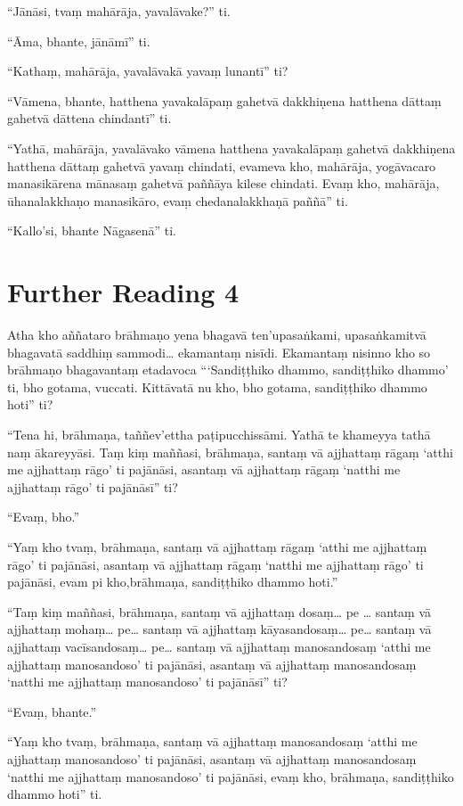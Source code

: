 “Jānāsi, tvaṃ mahārāja, yavalāvake?” ti.

“Āma, bhante, jānāmī” ti.

“Kathaṃ, mahārāja, yavalāvakā yavaṃ lunantī” ti?

“Vāmena, bhante, hatthena yavakalāpaṃ gahetvā dakkhiṇena hatthena dāttaṃ gahetvā dāttena chindantī” ti.

“Yathā, mahārāja, yavalāvako vāmena hatthena yavakalāpaṃ gahetvā dakkhiṇena hatthena dāttaṃ gahetvā yavaṃ chindati, evameva kho, mahārāja, yogāvacaro manasikārena mānasaṃ gahetvā paññāya kilese chindati. Evaṃ kho, mahārāja, ūhanalakkhaṇo manasikāro, evaṃ chedanalakkhaṇā paññā” ti.

“Kallo’si, bhante Nāgasenā” ti.

\section*{Further Reading 4}

Atha kho aññataro brāhmaṇo yena bhagavā ten’upasaṅkami, upasaṅkamitvā bhagavatā saddhiṃ sammodi… ekamantaṃ nisīdi. Ekamantaṃ nisinno kho so brāhmaṇo bhagavantaṃ etadavoca “‘Sandiṭṭhiko dhammo, sandiṭṭhiko dhammo’ ti, bho gotama, vuccati. Kittāvatā nu kho, bho gotama, sandiṭṭhiko dhammo hoti” ti?

“Tena hi, brāhmaṇa, taññev’ettha paṭipucchissāmi. Yathā te khameyya tathā naṃ ākareyyāsi. Taṃ kiṃ maññasi, brāhmaṇa, santaṃ vā ajjhattaṃ rāgaṃ ‘atthi me ajjhattaṃ rāgo’ ti pajānāsi, asantaṃ vā ajjhattaṃ rāgaṃ ‘natthi me ajjhattaṃ rāgo’ ti pajānāsī” ti?

“Evaṃ, bho.”

“Yaṃ kho tvaṃ, brāhmaṇa, santaṃ vā ajjhattaṃ rāgaṃ ‘atthi me ajjhattaṃ rāgo’ ti pajānāsi, asantaṃ vā ajjhattaṃ rāgaṃ ‘natthi me ajjhattaṃ rāgo’ ti pajānāsi, evam pi kho,brāhmaṇa, sandiṭṭhiko dhammo hoti.”

“Taṃ kiṃ maññasi, brāhmaṇa, santaṃ vā ajjhattaṃ dosaṃ… pe … santaṃ vā ajjhattaṃ mohaṃ… pe… santaṃ vā ajjhattaṃ kāyasandosaṃ… pe… santaṃ vā ajjhattaṃ vacīsandosaṃ… pe… santaṃ vā ajjhattaṃ manosandosaṃ ‘atthi me ajjhattaṃ manosandoso’ ti pajānāsi, asantaṃ vā ajjhattaṃ manosandosaṃ ‘natthi me ajjhattaṃ manosandoso’ ti pajānāsī” ti?

“Evaṃ, bhante.”

“Yaṃ kho tvaṃ, brāhmaṇa, santaṃ vā ajjhattaṃ manosandosaṃ ‘atthi me ajjhattaṃ manosandoso’ ti pajānāsi, asantaṃ vā ajjhattaṃ manosandosaṃ ‘natthi me ajjhattaṃ manosandoso’ ti pajānāsi, evaṃ kho, brāhmaṇa, sandiṭṭhiko dhammo hoti” ti.

